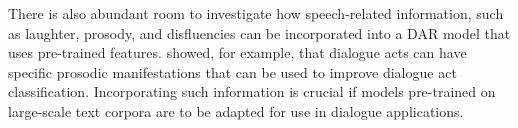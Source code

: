 \documentclass[11pt,a4paper]{article}
\begin{document}
There is also abundant room to investigate how speech-related information, such as laughter, prosody, 
and disfluencies can be incorporated into a DAR model that uses pre-trained features.
\citet{stolckeDialogueActModeling2000} showed, for example, that dialogue acts can have specific prosodic manifestations that can be used to improve dialogue act classification.
Incorporating such information is crucial if models pre-trained on large-scale text corpora are to be adapted for use in dialogue applications.





\end{document}
